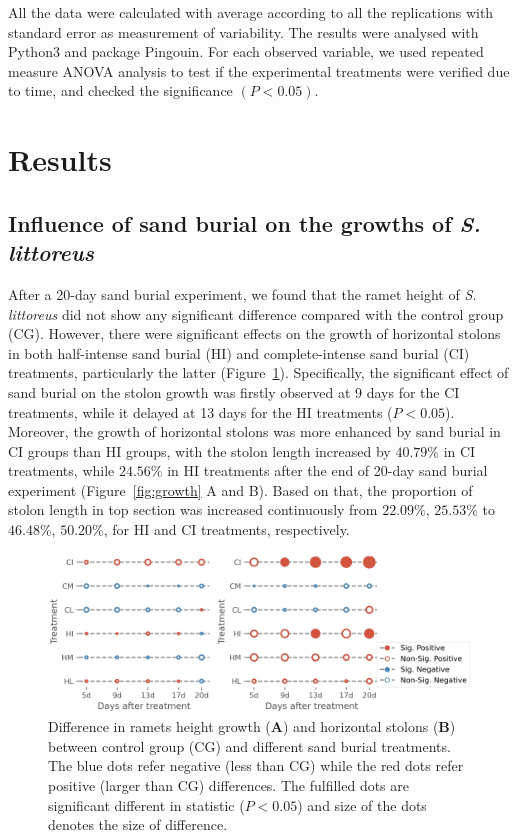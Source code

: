 \documentclass[]{interact}
\theoremstyle{plain}%
\theoremstyle{definition}
\theoremstyle{remark}
\begin{document}
All the data were calculated with average according to all the replications with standard error as measurement of variability. The results were analysed with Python3 and package Pingouin. For each observed variable, we used repeated measure ANOVA analysis to test if the experimental treatments were verified due to time, and checked the significance $(P<0.05)$.

\section{Results}

\subsection{Influence of sand burial on the growths of \textit{S. littoreus}}

After a 20-day sand burial experiment, we found that the ramet height of \textit{S. littoreus} did not show any significant difference compared with the control group (CG). However, there were significant effects on the growth of horizontal stolons in both half-intense sand burial (HI) and complete-intense sand burial (CI) treatments, particularly the latter (Figure~\ref{fig:lattice}). 
Specifically, the significant effect of sand burial on the stolon growth was firstly observed at 9 days for the CI treatments, while it delayed at 13 days for the HI treatments ($P<0.05$).
Moreover, the growth of horizontal stolons was more enhanced by sand burial in CI groups than HI groups, with the stolon length increased by $40.79\%$ in CI treatments, while $24.56\%$ in HI treatments after the end of 20-day sand burial experiment (Figure~\ref{fig:growth} A and B).
Based on that, the proportion of stolon length in top section was increased continuously from $22.09\%$, $25.53\%$ to $46.48\%$, $50.20\%$, for HI and CI treatments, respectively.

\begin{figure}[!h]
  \centering
  \includegraphics[scale=0.7]{../figs/grid_differences.jpg}
  \caption{
    Difference in ramets height growth (\textbf{A}) and horizontal stolons (\textbf{B}) between control group (CG) and different sand burial treatments. The blue dots refer negative (less than CG) while the red dots refer positive (larger than CG) differences. The fulfilled dots are significant different in statistic ($P<0.05$) and size of the dots denotes the size of difference.  
  } 
  \label{fig:lattice}
\end{figure}
\end{document}

